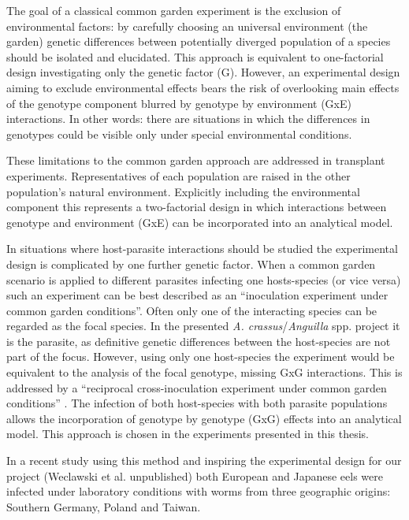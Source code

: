 The goal of a classical common garden experiment is the exclusion of
environmental factors: by carefully choosing an universal environment
(the garden) genetic differences between potentially diverged
population of a species should be isolated and elucidated. This
approach is equivalent to one-factorial design investigating only the
genetic factor (G). However, an experimental design aiming to exclude
environmental effects bears the risk of overlooking main effects of
the genotype component blurred by genotype by environment (GxE)
interactions. In other words: there are situations in which the
differences in genotypes could be visible only under special
environmental conditions.

These limitations to the common garden approach are addressed in
transplant experiments. Representatives of each population are raised
in the other population's natural environment. Explicitly including
the environmental component this represents a two-factorial design in
which interactions between genotype and environment (GxE) can be
incorporated into an analytical model.

In situations where host-parasite interactions should be studied the
experimental design is complicated by one further genetic factor.
When a common garden scenario is applied to different parasites
infecting one hosts-species (or vice versa) such an experiment can be
best described as an ``inoculation experiment under common garden
conditions''. Often only one of the interacting species can be
regarded as the focal species. In the presented
\textit{A. crassus}/\textit{Anguilla} spp. project it is the parasite,
as definitive genetic differences between the host-species are not
part of the focus. However, using only one host-species the experiment
would be equivalent to the analysis of the focal genotype, missing GxG
interactions. This is addressed by a ``reciprocal cross-inoculation
experiment under common garden conditions'' \cite{kaltz_shykoff_rev}.
The infection of both host-species with both parasite populations
allows the incorporation of genotype by genotype (GxG) effects into an
analytical model. This approach is chosen in the experiments presented
in this thesis.

In a recent study using this method and inspiring the experimental
design for our project (Weclawski et al. unpublished) both European
and Japanese eels were infected under laboratory conditions with worms
from three geographic origins: Southern Germany, Poland and Taiwan.


